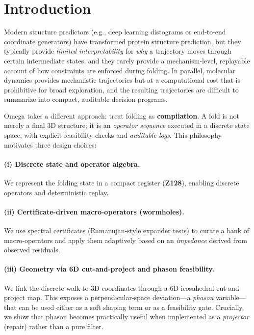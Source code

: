 \documentclass[10pt]{article}
\begin{document}
\section{Introduction}
Modern structure predictors (e.g., deep learning distograms or end-to-end coordinate generators) have transformed protein structure prediction, but they typically provide \emph{limited interpretability} for \emph{why} a trajectory moves through certain intermediate states, and they rarely provide a mechanism-level, replayable account of how constraints are enforced during folding.
In parallel, molecular dynamics provides mechanistic trajectories but at a computational cost that is prohibitive for broad exploration, and the resulting trajectories are difficult to summarize into compact, auditable decision programs.

Omega takes a different approach: treat folding as \textbf{compilation}. A fold is not merely a final 3D structure; it is an \emph{operator sequence} executed in a discrete state space, with explicit feasibility checks and \emph{auditable logs}. This philosophy motivates three design choices:

\paragraph{(i) Discrete state and operator algebra.}
We represent the folding state in a compact register (\textbf{Z128}), enabling discrete operators and deterministic replay.

\paragraph{(ii) Certificate-driven macro-operators (wormholes).}
We use spectral certificates (Ramanujan-style expander tests) to curate a bank of macro-operators and apply them adaptively based on an \emph{impedance} derived from observed residuals.

\paragraph{(iii) Geometry via 6D cut-and-project and phason feasibility.}
We link the discrete walk to 3D coordinates through a 6D icosahedral cut-and-project map. This exposes a perpendicular-space deviation—a \emph{phason} variable—that can be used either as a soft shaping term or as a feasibility gate. Crucially, we show that phason becomes practically useful when implemented as a \emph{projector} (repair) rather than a pure filter.
\end{document}
